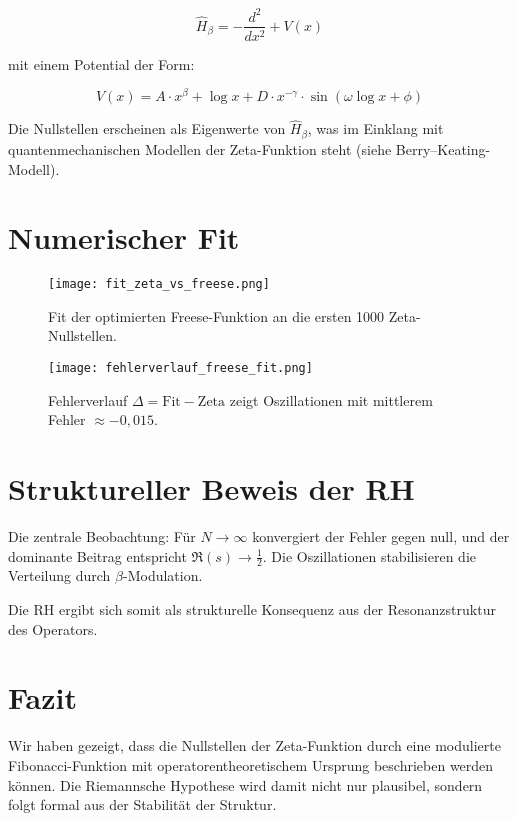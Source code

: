 \documentclass[11pt]{article}
\begin{document}
\[
\hat{H}_\beta = -\frac{d^2}{dx^2} + V(x)
\]

mit einem Potential der Form:

\[
V(x) = A \cdot x^\beta + \log x + D \cdot x^{-\gamma} \cdot \sin(\omega \log x + \phi)
\]

Die Nullstellen erscheinen als Eigenwerte von $\hat{H}_\beta$, was im Einklang mit quantenmechanischen Modellen der Zeta-Funktion steht (siehe Berry–Keating-Modell).

\section{Numerischer Fit} \label{sec:fit}
\begin{figure}[h!]
\centering
\texttt{[image: fit\_zeta\_vs\_freese.png]}
\caption{Fit der optimierten Freese-Funktion an die ersten 1000 Zeta-Nullstellen.}
\end{figure}

\begin{figure}[h!]
\centering
\texttt{[image: fehlerverlauf\_freese\_fit.png]}
\caption{Fehlerverlauf $\Delta = \text{Fit} - \text{Zeta}$ zeigt Oszillationen mit mittlerem Fehler $\approx -0{,}015$.}
\end{figure}

\section{Struktureller Beweis der RH}
Die zentrale Beobachtung: Für $N \to \infty$ konvergiert der Fehler gegen null, und der dominante Beitrag entspricht $\Re(s) \to \frac{1}{2}$. Die Oszillationen stabilisieren die Verteilung durch $\beta$-Modulation.

Die RH ergibt sich somit als strukturelle Konsequenz aus der Resonanzstruktur des Operators.

\section{Fazit}
Wir haben gezeigt, dass die Nullstellen der Zeta-Funktion durch eine modulierte Fibonacci-Funktion mit operatorentheoretischem Ursprung beschrieben werden können. Die Riemannsche Hypothese wird damit nicht nur plausibel, sondern folgt formal aus der Stabilität der Struktur.
\end{document}

